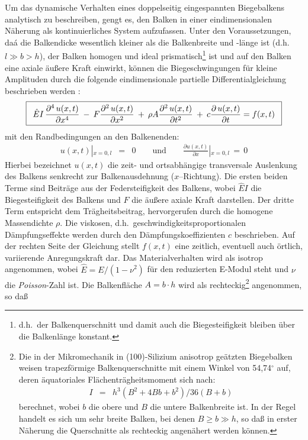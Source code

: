Um das dynamische Verhalten eines doppelseitig eingespannten Biegebalkens
analytisch zu beschreiben, gengt es, den Balken in
einer eindimensionalen Näherung als konti\-nuierliches System aufzufassen.
Unter den Voraussetzungen, daá die Balkendicke wesentlich kleiner als die
Balkenbreite und -länge ist (d.h.\ $l \gg b > h$), der Balken
homogen und ideal prismatisch\footnote{d.h.\ der Balkenquerschnitt und damit
auch die Biegesteifigkeit bleiben über die Balkenlänge konstant.} ist und auf
den Balken eine axiale äußere Kraft einwirkt, können die Biegeschwingungen
für kleine Amplituden durch die folgende eindimensionale
partielle Differentialgleichung beschrieben werden \cite{Wea90}:
%
\begin{equation}
\label{balkdgl}
\fbox{$
 \displaystyle
 \begin{array}{rcl}
  \hat E I \, \displaystyle \frac{\partial^{4} \, u(x,t)}{\partial x^{4}}
  \: - \:
  F \displaystyle \frac{ \partial ^{2} \, u(x,t)}{\partial x^{2}}
  \: + \:
  \rho A \displaystyle \frac{\partial ^{2} \, u(x,t)}{\partial t^{2}}
  \: + \:
  c \displaystyle \frac{\partial \, u(x,t)}{\partial t}
  = f(x,t)
 \end{array}
 $}
\end{equation}
%
mit den Randbedingungen an den Balkenenden:
%
\begin{eqnarray*}
  \displaystyle  u(x,t) \left |_{x=0,l} \right. & = & 0
  \qquad \mbox{und} \qquad
  \displaystyle \frac{ \partial u(x,t) }{\partial x} \displaystyle
  \left |_{x=0,l} \right. \, = \, 0
\end{eqnarray*}
%
Hierbei bezeichnet $u(x,t)$ die zeit- und ortsabhängige transversale
Auslenkung des Balkens senkrecht zur Balkenausdehnung ($x$--Richtung).
Die ersten beiden Terme sind Beiträge aus der
Federsteifigkeit des Balkens, wobei $\hat E I$ die Biegesteifigkeit des
Balkens und $F$ die äußere axiale Kraft darstellen. Der dritte Term
entspricht dem Trägheitsbeitrag, hervorgerufen durch die
homogene Massendichte $\rho$. Die viskosen, d.h.\
geschwindigkeitsproportionalen Dämpfungseffekte werden
durch den Dämpfungskoeffizienten $c$ beschrieben. Auf der rechten Seite
der Gleichung stellt $f(x,t)$ eine zeitlich, eventuell auch örtlich,
variierende Anregungskraft dar. Das Materialverhalten wird als isotrop
angenommen, wobei $\hat E = E / (1-\nu^{2})$ für den
reduzierten E-Modul steht und $\nu$ die {\sl Poisson}-Zahl ist.
Die Balkenfläche $A = b \cdot h$ wird als rechteckig\footnote{Die in der
Mikromechanik in (100)-Silizium anisotrop geätzten Biegebalken weisen
trapezförmige Balkenquerschnitte mit einem Winkel von 54,74$^{\circ}$ auf,
deren äquatoriales Flächenträgheitsmoment sich nach:
\begin{eqnarray}
 I & = & h^{3}(B^2+4Bb+b^2)/36(B+b)
\end{eqnarray}
berechnet, wobei $b$ die obere und $B$
die untere Balkenbreite ist. In der Regel handelt es sich um sehr breite
Balken, bei denen $B \geq b \gg h$, so daß in erster Näherung die
Querschnitte als rechteckig angenähert werden können.} angenommen, so daß
